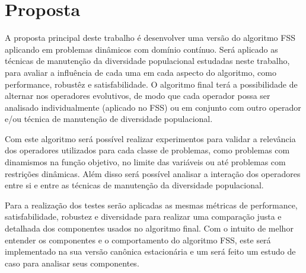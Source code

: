 \chapter{Proposta}
\label{ch:proposta}

A proposta principal deste trabalho é desenvolver uma versão do algoritmo FSS aplicando em problemas dinâmicos com domínio contínuo. Será aplicado as técnicas de manutenção da diversidade populacional estudadas neste trabalho, para avaliar a influência de cada uma em cada aspecto do algoritmo, como performance, robustêz e satisfabilidade. O algoritmo final terá a possibilidade de alternar nos operadores evolutivos, de modo que cada operador possa ser analisado individualmente (aplicado no FSS) ou em conjunto com outro operador e/ou técnica de manutenção de diversidade populacional.

Com este algoritmo será possível realizar experimentos para validar a relevância dos operadores utilizados para cada classe de problemas, como problemas com dinamismos na função objetivo, no limite das variáveis ou até problemas com restrições dinâmicas. Além disso será possível analisar a interação dos operadores entre si e entre as técnicas de manutenção da diversidade populacional.

Para a realização dos testes serão aplicadas as mesmas métricas de performance, satisfabilidade, robustez e diversidade para realizar uma comparação justa e detalhada dos componentes usados no algoritmo final. Com o intuito de melhor entender os componentes e o comportamento do algoritmo FSS, este será implementado na sua versão canônica estacionária e um será feito um estudo de caso para analisar seus componentes.

